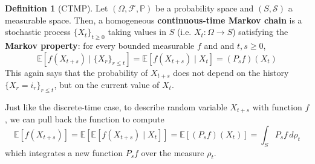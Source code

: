 \documentclass{article}
\theoremstyle{definition}
\theoremstyle{remark}
\theoremstyle{definition}
\newtheorem{definition}{Definition}[section]
\begin{document}
\begin{definition}[CTMP]
Let $(\Omega, \mathcal{F}, \mathbb{P})$ be a probability space and $(S, \mathcal{S})$ a measurable space. Then, a homogeneous \textbf{continuous-time Markov chain} is a stochastic process $\{X_t\}_{t \geq 0}$ taking values in $S$ (i.e. $X_t: \Omega \rightarrow S$) satisfying the \textbf{Markov property}: for every bounded measurable $f$ and and $t, s \geq 0$, 
\[\mathbb{E}[ f(X_{t + s}) \mid \{X_r\}_{r \leq t} ] = \mathbb{E}[ f(X_{t + s}) \mid X_t ] = (P_s f)(X_t)\]
This again says that the probability of $X_{t + s}$ does not depend on the history $\{X_r = i_r\}_{r \leq t}$, but on the current value of $X_t$. 
\end{definition}

Just like the discrete-time case, to describe random variable $X_{t + s}$ with function $f$, we can pull back the function to compute 
\[\mathbb{E}[f(X_{t + s})] = \mathbb{E}[ \mathbb{E}[ f(X_{t + s}) \mid X_t]] = \mathbb{E}[ (P_s f) (X_t)] = \int_S P_s f \, d\rho_t\]
which integrates a new function $P_s f$ over the measure $\rho_t$. 
\end{document}
